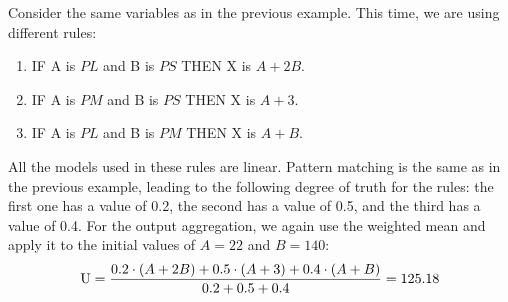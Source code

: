 \begin{example}
    Consider the same variables as in the previous example. This time, we are using different rules:
    \begin{enumerate}
        \item IF A is $PL$ and B is $PS$ THEN X is $A+2B$.
        \item IF A is $PM$ and B is $PS$ THEN X is $A+3$. 
        \item IF A is $PL$ and B is $PM$ THEN X is $A+B$.
    \end{enumerate}
    All the models used in these rules are linear. 
    Pattern matching is the same as in the previous example, leading to the following degree of truth for the rules: the first one has a value of 0.2, the second has a value of 0.5, and the third has a value of 0.4.
    For the output aggregation, we again use the weighted mean and apply it to the initial values of $A=22$ and $B=140$:
    \[\textnormal{U}=\dfrac{0.2 \cdot (A+2B)+0.5 \cdot (A+3)+ 0.4 \cdot (A+B)}{0.2+0.5+0.4}=125.18\]
\end{example}